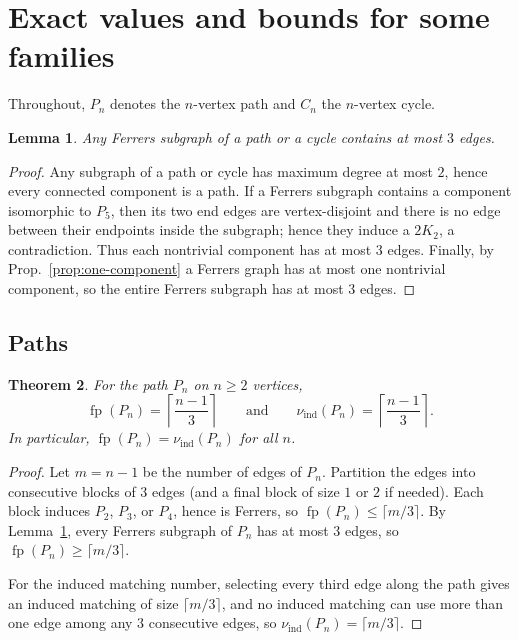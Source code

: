 \documentclass[12pt]{amsart}
\newtheorem{theorem}{Theorem}
\newtheorem{lemma}[theorem]{Lemma}
\newcommand{\fp}{\operatorname{fp}}
\newcommand{\ind}{\operatorname{ind}}
\begin{document}
\section{Exact values and bounds for some families}
\label{sec:families}

Throughout, $P_n$ denotes the $n$-vertex path and $C_n$ the $n$-vertex cycle.


\begin{lemma}
\label{lem:path-max3}
Any Ferrers subgraph of a path or a cycle contains at most $3$ edges.
\end{lemma}

\begin{proof}
Any subgraph of a path or cycle has maximum degree at most $2$, hence every connected component is a path.
If a Ferrers subgraph contains a component isomorphic to $P_5$, then its two end edges are vertex-disjoint and there is no edge between their endpoints inside the subgraph; hence they induce a $2K_2$, a contradiction. Thus each nontrivial component has at most $3$ edges. Finally, by Prop.~\ref{prop:one-component} a Ferrers graph has at most one nontrivial component, so the entire Ferrers subgraph has at most $3$ edges.
\end{proof}

\subsection{Paths}

\begin{theorem}
\label{thm:path}
For the path $P_n$ on $n\ge 2$ vertices,
\[
\fp(P_n)=\left\lceil \frac{n-1}{3}\right\rceil
\qquad\text{and}\qquad
\nu_{\ind}(P_n)=\left\lceil \frac{n-1}{3}\right\rceil.
\]
In particular, $\fp(P_n)=\nu_{\ind}(P_n)$ for all $n$.
\end{theorem}

\begin{proof}
Let $m=n-1$ be the number of edges of $P_n$.
Partition the edges into consecutive blocks of $3$ edges (and a final block of size $1$ or $2$ if needed).
Each block induces $P_2$, $P_3$, or $P_4$, hence is Ferrers, so $\fp(P_n)\le \lceil m/3\rceil$.
By Lemma~\ref{lem:path-max3}, every Ferrers subgraph of $P_n$ has at most $3$ edges, so $\fp(P_n)\ge \lceil m/3\rceil$.

For the induced matching number, selecting every third edge along the path gives an induced matching of size $\lceil m/3\rceil$, and no induced matching can use more than one edge among any $3$ consecutive edges, so $\nu_{\ind}(P_n)=\lceil m/3\rceil$.
\end{proof}
\end{document}
